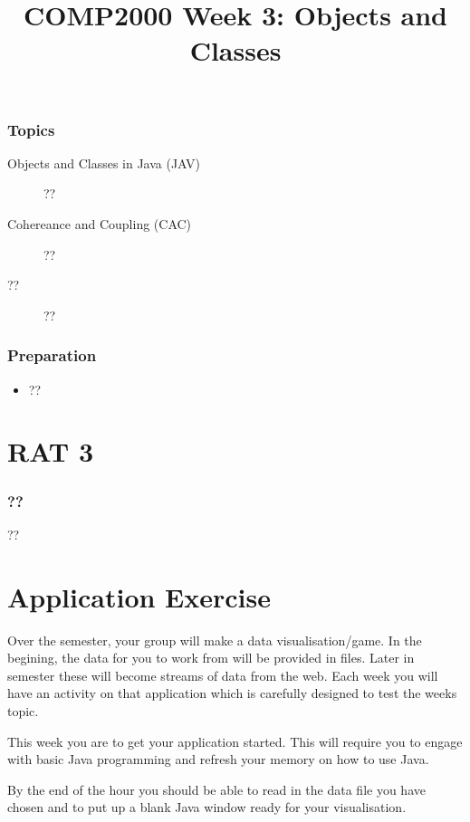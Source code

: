\documentclass[twoside=false,DIV=14]{scrartcl}
\title{\color{redish} \vspace{-1em}COMP2000 Week 3: Objects and Classes}
\begin{document}
{\color{blackish}\maketitle}\vspace{-7em}

\begin{abstract}
\end{abstract}

\section*{Topics}
\begin{description}
    \item[Objects and Classes in Java (JAV)]??
    \item[Cohereance and Coupling (CAC)] ??
\item [??] ??
\end{description}
\section*{Preparation}
\begin{itemize}
\item ??
\end{itemize}


\newpage
\part*{RAT 3}
\section*{??}
??

\newpage
\part*{Application Exercise}
Over the semester, your group will make a data visualisation/game.  In the begining, the data for you to work from will be provided in files.  Later in semester these will become streams of data from the web.  Each week you will have an activity on that application which is carefully designed to test the weeks topic.  

This week you are to get your application started.  This will require you to engage with basic Java programming and refresh your memory on how to use Java.

By the end of the hour you should be able to read in the data file you have chosen and to put up a blank Java window ready for your visualisation.
\end{document}
